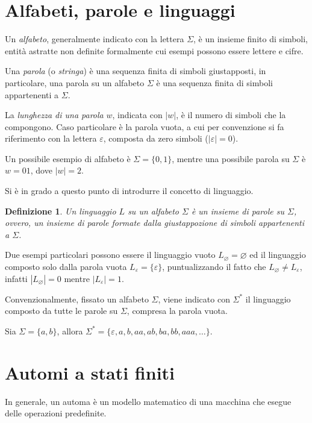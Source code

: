 \documentclass[a4paper,12pt,twoside, openright]{report} %
\newtheorem{definition}{Definizione}[chapter] %
\begin{document}
\section{Alfabeti, parole e linguaggi}

Un \emph{alfabeto}, generalmente indicato con la lettera $\Sigma$, è un insieme finito di simboli,
entità astratte non definite formalmente cui esempi possono essere lettere e cifre.

Una \emph{parola} (o \emph{stringa}) è una sequenza finita di simboli giustapposti, in particolare, una parola su un alfabeto $\Sigma$
è una sequenza finita di simboli appartenenti a $\Sigma$.

La \emph{lunghezza di una parola} $w$, indicata con $|w|$, è il numero di simboli che la compongono.
Caso particolare è la parola vuota, a cui per convenzione si fa riferimento con la lettera $\varepsilon$,
composta da zero simboli ($|\varepsilon| = 0$).

Un possibile esempio di alfabeto è $\Sigma = \{0, 1\}$, mentre una possibile parola su $\Sigma$ è
$w = 01$, dove $|w| = 2$.

Si è in grado a questo punto di introdurre il concetto di linguaggio.

\begin{definition}\label{def:lang}
  Un \emph{linguaggio} $L$ su un alfabeto $\Sigma$ è un insieme di parole su $\Sigma$, ovvero, un insieme di
  parole formate dalla giustappozione di simboli appartenenti a $\Sigma$.
\end{definition}

Due esempi particolari possono essere il linguaggio vuoto $L_\varnothing = \varnothing$ ed il linguaggio composto
solo dalla parola vuota $L_\varepsilon = \{\varepsilon\}$, puntualizzando il fatto che $L_\varnothing \neq L_\varepsilon$,
infatti $|L_\varnothing| = 0$ mentre $|L_\varepsilon| = 1$.

Convenzionalmente, fissato un alfabeto $\Sigma$, viene indicato con $\Sigma^*$ il linguaggio composto da tutte
le parole su $\Sigma$, compresa la parola vuota.

Sia $\Sigma = \{a, b\}$, allora $\Sigma^* = \{\varepsilon, a, b, aa, ab, ba, bb, aaa, \dots\}$.

\section{Automi a stati finiti}

In generale, un automa è un modello matematico di una macchina che esegue delle operazioni predefinite.
\end{document}
